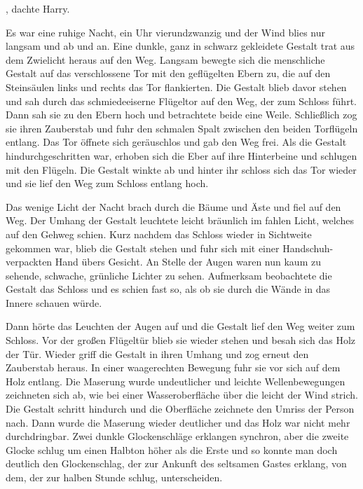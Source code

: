 , dachte Harry.

\trenn

Es war eine ruhige Nacht, ein Uhr vierundzwanzig und der Wind blies nur langsam und ab und an. Eine dunkle, ganz in schwarz gekleidete Gestalt trat aus dem Zwielicht heraus auf den Weg. Langsam bewegte sich die menschliche Gestalt auf das verschlossene Tor mit den geflügelten Ebern zu, die auf den Steinsäulen links und rechts das Tor flankierten. Die Gestalt blieb davor stehen und sah durch das schmiedeeiserne Flügeltor auf den Weg, der zum Schloss führt. Dann sah sie zu den Ebern hoch und betrachtete beide eine Weile. Schließlich zog sie ihren Zauberstab und fuhr den schmalen Spalt zwischen den beiden Torflügeln entlang. Das Tor öffnete sich geräuschlos und gab den Weg frei. Als die Gestalt hindurchgeschritten war, erhoben sich die Eber auf ihre Hinterbeine und schlugen mit den Flügeln. Die Gestalt winkte ab und hinter ihr schloss sich das Tor wieder und sie lief den Weg zum Schloss entlang hoch.

Das wenige Licht der Nacht brach durch die Bäume und Äste und fiel auf den Weg. Der Umhang der Gestalt leuchtete leicht bräunlich im fahlen Licht, welches auf den Gehweg schien. Kurz nachdem das Schloss wieder in Sichtweite gekommen war, blieb die Gestalt stehen und fuhr sich mit einer Handschuh-verpackten Hand übers Gesicht. An Stelle der Augen waren nun kaum zu sehende, schwache, grünliche Lichter zu sehen. Aufmerksam beobachtete die Gestalt das Schloss und es schien fast so, als ob sie durch die Wände in das Innere schauen würde.

Dann hörte das Leuchten der Augen auf und die Gestalt lief den Weg weiter zum Schloss. Vor der großen Flügeltür blieb sie wieder stehen und besah sich das Holz der Tür. Wieder griff die Gestalt in ihren Umhang und zog erneut den Zauberstab heraus. In einer waagerechten Bewegung fuhr sie vor sich auf dem Holz entlang. Die Maserung wurde undeutlicher und leichte Wellenbewegungen zeichneten sich ab, wie bei einer Wasseroberfläche über die leicht der Wind strich. Die Gestalt schritt hindurch und die Oberfläche zeichnete den Umriss der Person nach. Dann wurde die Maserung wieder deutlicher und das Holz war nicht mehr durchdringbar. Zwei dunkle Glockenschläge erklangen synchron, aber die zweite Glocke schlug um einen Halbton höher als die Erste und so konnte man doch deutlich den Glockenschlag, der zur Ankunft des seltsamen Gastes erklang, von dem, der zur halben Stunde schlug, unterscheiden.

